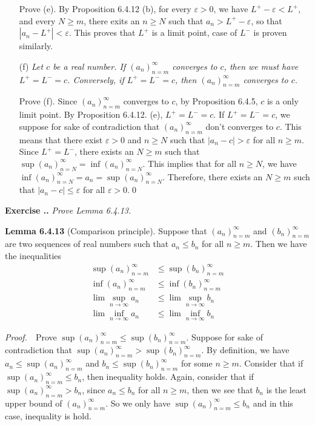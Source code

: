 \documentclass{book}
\newcommand{\pff}{\vspace{.25em}\noindent\emph{Proof.}~~}
\newcommand{\titl}[1]{\noindent\textbf{#1}}
\newcounter{Exercise}[section]
\renewcommand{\theExercise}{\thesection.\arabic{Exercise}.}
\newcommand{\new}{\vspace{1.5em}\noindent\textbf{{Exercise \stepcounter{Exercise}\textbf{\theExercise}}} }
\begin{document}
\begin{enumerate}
    Prove (e). By Proposition 6.4.12 (b), for every $\varepsilon>0$, we have $L^+-\varepsilon<L^+$, and every $N\geq m$, there exits an $n\geq N$ such that $a_n>L^+-\varepsilon$, so that $|a_n-L^+|<\varepsilon$. This proves that $L^+$ is a limit point, case of $L^-$ is proven similarly.

    \item[(f)] \emph{Let $c$ be a real number. If $(a_n)_{n=m}^\infty$ converges to $c$, then we must have $L^+=L^-=c$. Conversely, if $L^+=L^-=c$, then $(a_n)_{n=m}^\infty$ converges to $c$.}

    Prove (f). Since $(a_n)_{n=m}^\infty$ converges to $c$, by Proposition 6.4.5, $c$ is a only limit point. By Proposition 6.4.12. (e), $L^+=L^-=c$. If $L^+=L^-=c$, we suppose for sake of contradiction that $(a_n)_{n=m}^\infty$ don't converges to $c$. This means that there exist $\varepsilon>0$ and $n\geq N$ such that $|a_n-c|>\varepsilon$ for all $n\geq m$. Since $L^+=L^-$, there exists an $N\geq m$ such that $\sup(a_n)_{n=N}^\infty=\inf(a_n)_{n=N}^\infty$. This implies that for all $n\geq N$, we have $\inf(a_n)_{n=N}^\infty=a_n=\sup(a_n)_{n=N}^\infty$. Therefore, there exists an $N\geq m$ such that $|a_n-c|\leq\varepsilon$ for all $\varepsilon>0$.\qed
\end{enumerate}

\new\emph{Prove Lemma 6.4.13.}

\begin{framed}
\titl{Lemma 6.4.13} (Comparison principle). Suppose that $(a_n)_{n=m}^{\infty}$ and $(b_n)_{n=m}^{\infty}$ are two sequences of real numbers such that $a_n\leq b_n$ for all $n\geq m$. Then we have the inequalities
    \begin{align*}
        \sup(a_n)_{n=m}^{\infty}&\leq\sup(b_n)_{n=m}^{\infty}\\
        \inf(a_n)_{n=m}^{\infty}&\leq\inf(b_n)_{n=m}^{\infty}\\
        \lim\sup_{n\to\infty}a_n&\leq\lim\sup_{n\to\infty}b_n\\
        \lim\inf_{n\to\infty}a_n&\leq\lim\inf_{n\to\infty}b_n
    \end{align*}
\end{framed}

\pff Prove $\sup(a_n)_{n=m}^\infty\leq\sup(b_n)_{n=m}^\infty$. Suppose for sake of contradiction that $\sup(a_n)_{n=m}^\infty>\sup(b_n)_{n=m}^\infty$. By definition, we have $a_n\leq\sup(a_n)_{n=m}^\infty$ and $b_n\leq\sup(b_n)_{n=m}^\infty$ for some $n\geq m$. Consider that if $\sup(a_n)_{n=m}^\infty\leq b_n$, then inequality holds. Again, consider that if $\sup(a_n)_{n=m}^\infty>b_n$, since $a_n\leq b_n$ for all $n\geq m$, then we see that $b_n$ is the least upper bound of $(a_n)_{n=m}^\infty$. So we only have $\sup(a_n)_{n=m}^\infty\leq b_n$ and in this case, inequality is hold.
\end{document}
